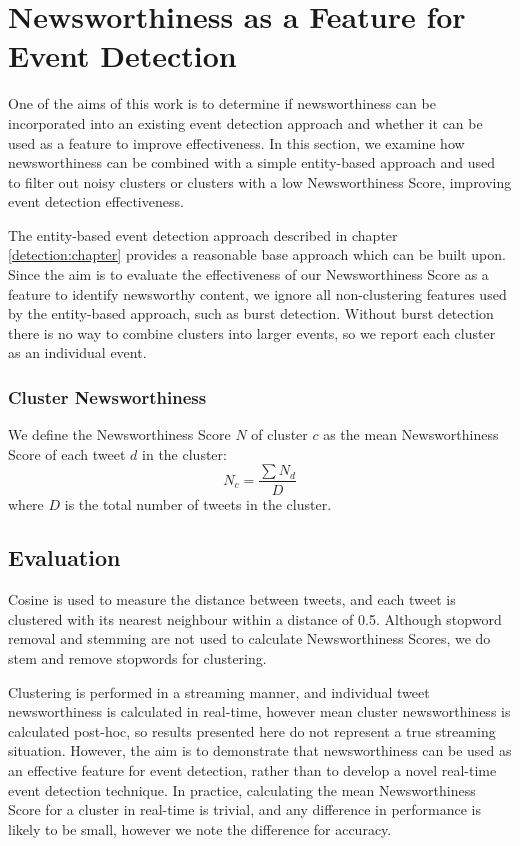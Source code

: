 
\section{Newsworthiness as a Feature for Event Detection}
\label{scoring:sec:detection}

One of the aims of this work is to determine if newsworthiness can be incorporated into an existing event detection approach and whether it can be used as a feature to improve effectiveness.
In this section, we examine how newsworthiness can be combined with a simple entity-based approach and used to filter out noisy clusters or clusters with a low Newsworthiness Score, improving event detection effectiveness.

The entity-based event detection approach described in chapter \ref{detection:chapter} provides a reasonable base approach which can be built upon.
Since the aim is to evaluate the effectiveness of our Newsworthiness Score as a feature to identify newsworthy content, we ignore all non-clustering features used by the entity-based approach, such as burst detection.
Without burst detection there is no way to combine clusters into larger events, so we report each cluster as an individual event.

\subsubsection{Cluster Newsworthiness}

We define the Newsworthiness Score \(N\) of cluster \(c\) as the mean Newsworthiness Score of each tweet \(d\) in the cluster:
\begin{displaymath}
	N_c = \frac{\sum{N_d}}{D}
\end{displaymath}
where \(D\) is the total number of tweets in the cluster.

\subsection{Evaluation}
\label{scoring:sec:detectionEval}

Cosine is used to measure the distance between tweets, and each tweet is clustered with its nearest neighbour within a distance of 0.5.
Although stopword removal and stemming are not used to calculate Newsworthiness Scores, we do stem and remove stopwords for clustering.

Clustering is performed in a streaming manner, and individual tweet newsworthiness is calculated in real-time, however mean cluster newsworthiness is calculated post-hoc, so results presented here do not represent a true streaming situation.
However, the aim is to demonstrate that newsworthiness can be used as an effective feature for event detection, rather than to develop a novel real-time event detection technique.
In practice, calculating the mean Newsworthiness Score for a cluster in real-time is trivial, and any difference in performance is likely to be small, however we note the difference for accuracy.

